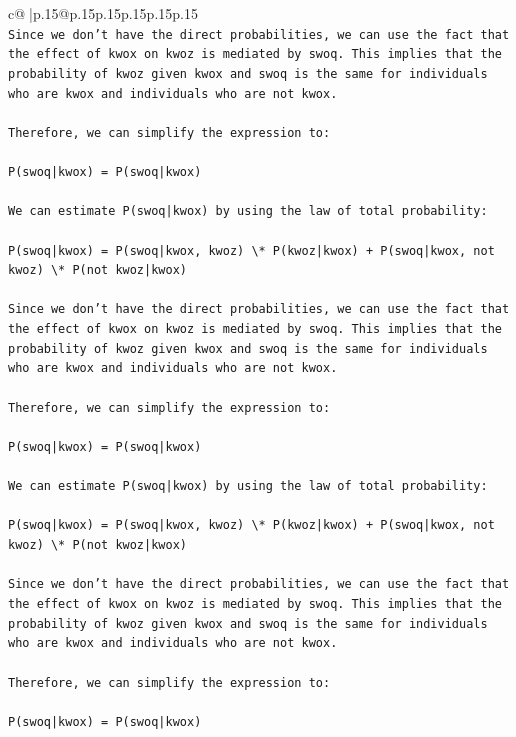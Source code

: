 \documentclass{article}
\begin{document}
{\begin{supertabular}{c@{$\;$}|p{.15\linewidth}@{}p{.15\linewidth}p{.15\linewidth}p{.15\linewidth}p{.15\linewidth}p{.15\linewidth}}
{{{\\ 
\texttt{Since we don't have the direct probabilities, we can use the fact that the effect of kwox on kwoz is mediated by swoq. This implies that the probability of kwoz given kwox and swoq is the same for individuals who are kwox and individuals who are not kwox.} \\
\\ 
\texttt{Therefore, we can simplify the expression to:} \\
\\ 
\texttt{P(swoq|kwox) = P(swoq|kwox)} \\
\\ 
\texttt{We can estimate P(swoq|kwox) by using the law of total probability:} \\
\\ 
\texttt{P(swoq|kwox) = P(swoq|kwox, kwoz) \textbackslash{}* P(kwoz|kwox) + P(swoq|kwox, not kwoz) \textbackslash{}* P(not kwoz|kwox)} \\
\\ 
\texttt{Since we don't have the direct probabilities, we can use the fact that the effect of kwox on kwoz is mediated by swoq. This implies that the probability of kwoz given kwox and swoq is the same for individuals who are kwox and individuals who are not kwox.} \\
\\ 
\texttt{Therefore, we can simplify the expression to:} \\
\\ 
\texttt{P(swoq|kwox) = P(swoq|kwox)} \\
\\ 
\texttt{We can estimate P(swoq|kwox) by using the law of total probability:} \\
\\ 
\texttt{P(swoq|kwox) = P(swoq|kwox, kwoz) \textbackslash{}* P(kwoz|kwox) + P(swoq|kwox, not kwoz) \textbackslash{}* P(not kwoz|kwox)} \\
\\ 
\texttt{Since we don't have the direct probabilities, we can use the fact that the effect of kwox on kwoz is mediated by swoq. This implies that the probability of kwoz given kwox and swoq is the same for individuals who are kwox and individuals who are not kwox.} \\
\\ 
\texttt{Therefore, we can simplify the expression to:} \\
\\ 
\texttt{P(swoq|kwox) = P(swoq|kwox)} \\
}}}
\end{supertabular}}
\end{document}
